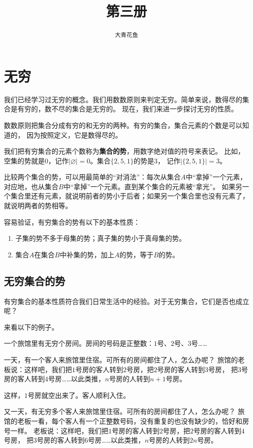 \documentclass[12pt,UTF8]{ctexbook}
\title{\zihao{0} \bfseries 第三册}
\author{\zihao{2} \texttt{大青花鱼}}
\date{}
\begin{document}
\maketitle
\tableofcontents
\newpage

\chapter{无穷}
我们已经学习过无穷的概念。我们用数数原则来判定无穷。简单来说，数得尽的集合是有穷的，数不尽的集合是无穷的。
现在，我们来进一步探讨无穷的性质。

数数原则把集合分成有穷的和无穷的两种。有穷的集合，集合元素的个数是可以知道的，
因为按照定义，它是数得尽的。

我们把有穷集合的元素个数称为\textbf{集合的势}，用数字绝对值的符号来表记。
比如，空集的势就是$0$，记作$|\varnothing| = 0$。集合$\{2,5,1\}$的势是$3$，
记作$|\{2, 5, 1\}| = 3$。

比较两个集合的势，可以用最简单的“对消法”：每次从集合$A$中“拿掉”一个元素，
对应地，也从集合$B$中“拿掉”一个元素。直到某个集合的元素被“拿光”。
如果另一个集合里还有元素，就说明前者的势小于后者；如果另一个集合里也没有元素了，就说明两者的势相等。

容易验证，有穷集合的势有以下的基本性质：
\begin{enumerate}
    \item 子集的势不多于母集的势；真子集的势小于真母集的势。
    \item 集合$A$在集合$B$中补集的势，加上$A$的势，等于$B$的势。
\end{enumerate}

\section{无穷集合的势}

有穷集合的基本性质符合我们日常生活中的经验。对于无穷集合，它们是否也成立呢？

来看以下的例子。

一个旅馆里有无穷个房间。房间的号码是正整数：$1$号、$2$号、$3$号……

一天，有一个客人来旅馆里住宿。可所有的房间都住了人，怎么办呢？
旅馆的老板说：这样吧，我们把$1$号房的客人转到$2$号房，把$2$号房的客人转到$3$号房，
把$3$号房的客人转到$4$号房……以此类推，$n$号房的人转到$n+1$号房。

这样，$1$号房就空出来了。客人顺利入住。

又一天，有无穷多个客人来旅馆里住宿。可所有的房间都住了人，怎么办呢？
旅馆的老板一看，每个客人有一个正整数号码，没有重复的也没有缺少的，恰好和房号一样。
老板说：这样吧，我们把$1$号房的客人转到$2$号房，把$2$号房的客人转到$4$号房，
把$3$号房的客人转到$6$号房……以此类推，$n$号房的人转到$2n$号房。
\end{document}
